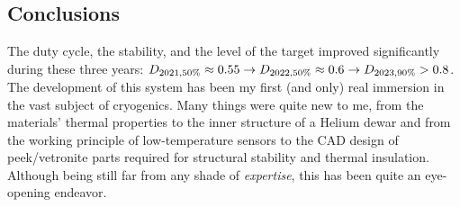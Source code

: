 \begin{refsection}
\section{Conclusions}
    The duty cycle, the stability, and the level of the target improved significantly during these three years: $D_{2021, 50\%}\approx 0.55 \rightarrow D_{2022, 50\%}\approx0.6 \rightarrow D_{2023, 90\%}>0.8$.\\

    \noindent
    The development of this system has been my first (and only) real immersion in the vast subject of cryogenics. 
    Many things were quite new to me, from the materials' thermal properties to the inner structure of a Helium dewar and from the working principle of low-temperature sensors to the CAD design of peek/vetronite parts required for structural stability and thermal insulation.
    Although being still far from any shade of \textit{expertise}, this has been quite an eye-opening endeavor.
    
\printbibliography[
    heading = bibliographychapter,
    title=Bibliography on \ce{LH2}
]

\end{refsection}

